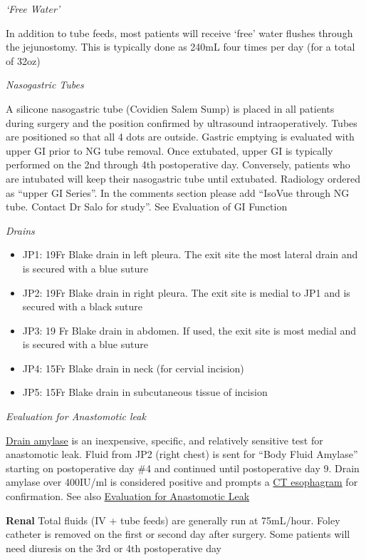 \documentclass[
  letterpaper,
]{scrbook}
\providecommand{\tightlist}{%
  \setlength{\itemsep}{0pt}\setlength{\parskip}{0pt}}
\begin{document}
\emph{`Free Water'}

In addition to tube feeds, most patients will receive `free' water
flushes through the jejunostomy. This is typically done as 240mL four
times per day (for a total of 32oz)

\emph{Nasogastric Tubes}

A silicone nasogastric tube (Covidien Salem Sump) is placed in all
patients during surgery and the position confirmed by ultrasound
intraoperatively. Tubes are positioned so that all 4 dots are outside.
Gastric emptying is evaluated with upper GI prior to NG tube removal.
Once extubated, upper GI is typically performed on the 2nd through 4th
postoperative day. Conversely, patients who are intubated will keep
their nasogastric tube until extubated. Radiology ordered as ``upper GI
Series''. In the comments section please add ``IsoVue through NG tube.
Contact Dr Salo for study''. See Evaluation of GI Function

\emph{Drains}

\begin{itemize}
\tightlist
\item
  JP1: 19Fr Blake drain in left pleura. The exit site the most lateral
  drain and is secured with a blue suture
\item
  JP2: 19Fr Blake drain in right pleura. The exit site is medial to JP1
  and is secured with a black suture
\item
  JP3: 19 Fr Blake drain in abdomen. If used, the exit site is most
  medial and is secured with a blue suture
\item
  JP4: 15Fr Blake drain in neck (for cervial incision)
\item
  JP5: 15Fr Blake drain in subcutaneous tissue of incision
\end{itemize}

\emph{Evaluation for Anastomotic leak}

\hyperref[drain_amylase]{Drain amylase} is an inexpensive, specific, and
relatively sensitive test for anastomotic leak. Fluid from JP2 (right
chest) is sent for ``Body Fluid Amylase'' starting on postoperative day
\#4 and continued until postoperative day 9. Drain amylase over 400IU/ml
is considered positive and prompts a \hyperref[ct_esophagram]{CT
esophagram} for confirmation. See also
\hyperref[leak_evaluation]{Evaluation for Anastomotic Leak}

\textbf{Renal} Total fluids (IV + tube feeds) are generally run at
75mL/hour. Foley catheter is removed on the first or second day after
surgery. Some patients will need diuresis on the 3rd or 4th
postoperative day
\end{document}
